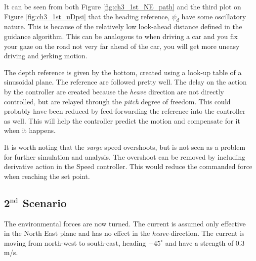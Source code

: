 		It can be seen from both Figure \ref{fig:ch3_1st_NE_path} and the
		third plot on Figure \ref{fig:ch3_1st_uDpsi} that the heading reference, $\psi_d$ have some
		oscillatory nature. This is because of the relatively low look-ahead distance defined in the
		guidance algorithm. This can be analogous to when driving a car and you fix your gaze on
		the road not very far ahead of the car, you will get more uneasy driving and jerking
		motion. 

		The depth reference is given by the bottom, created using a look-up table of a sinusoidal plane.
		The reference are followed pretty well. The delay on the
		action by the controller are created because the \textit{heave} direction are not directly
		controlled, but are relayed through the \textit{pitch} degree of freedom. This could probably
		have been reduced by feed-forwarding the reference into the controller as well. This will help
		the controller predict the motion and compensate for it when it happens.

		It is worth noting that the \textit{surge} speed overshoots, but is not seen as a problem for
		further simulation and analysis. The overshoot can be removed by including derivative action
		in the Speed controller. This would reduce the commanded force when reaching the set point.

	
	\subsection{2$^{\mathrm{nd}}$ Scenario}
		The environmental forces are now turned. The current is assumed only effective in the North
		East plane and has no effect in the \textit{heave}-direction. The current is moving from
		north-west to south-east, heading $-45^{\circ}$ and have a strength of $0.3$ m/s. 
		
